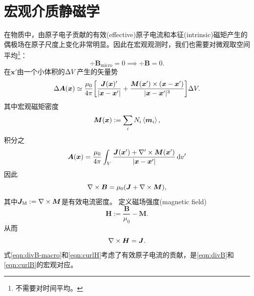 \section{宏观介质静磁学}
\label{sec:macroscopic magnetostatics}

在物质中，由原子电子贡献的有效(effective)原子电流和本征(intrinsic)磁矩产生的偶极场在原子尺度上变化非常明显。因此在宏观观测时，我们也需要对微观取空间平均\footnote{不需要对时间平均。}：
\begin{equation}
    \label{eqn:divB-macro}
    \div\bm B_\text{micro}=0\implies\div\bm B=0.
\end{equation}
在$\bm x'$由一个小体积的$\Delta V$产生的矢量势
\[
    \Delta\bm A(\bm x)\simeq\frac{\mu_0}{4\pi}\biggl[\frac{\bm J(\bm x)'}{|\bm x-\bm x'|}+\frac{\bm M(\bm x')\times(\bm x-\bm x')}{|\bm x-\bm x'|^3}\biggr]\Delta V.
\]
其中宏观磁矩密度
\[
    \bm M(\bm x):=\sum_iN_i\left\langle \bm m_i\right\rangle,
\]
积分之
\[
    \bm A(\bm x)=\frac{\mu_0}{4\pi}\int_V\frac{\bm J(\bm x')+\nabla'\times\bm M(\bm x')}{|\bm x-\bm x'|}\mathop{}\!\mathrm{d} v'
\]
因此 
\[
    \nabla\times\bm B=\mu_0(\bm J+\nabla\times\bm M),
\]
其中$\bm J_\text M:=\nabla\times\bm M$是有效电流密度。
定义磁场强度(magnetic field)
\begin{equation}
    \bm H:=\frac{\bm B}{\mu_0}-\bm M.
\end{equation}
从而 
\begin{equation}
    \label{eqn:curlH}
    \nabla\times\bm H=\bm J.
\end{equation}
式\eqref{eqn:divB-macro}和\eqref{eqn:curlH}考虑了有效原子电流的贡献，是\eqref{eqn:divB}和\eqref{eqn:curlB}的宏观对应。
